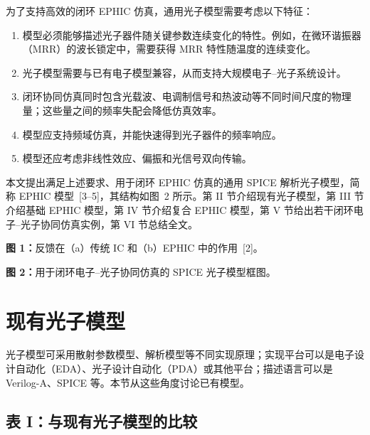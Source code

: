 \documentclass[11pt,a4paper]{ctexart}
\begin{document}
为了支持高效的闭环 EPHIC 仿真，通用光子模型需要考虑以下特征：

\begin{enumerate}[label=\arabic*.]
  \item 模型必须能够描述光子器件随关键参数连续变化的特性。例如，在微环谐振器（MRR）的波长锁定中，需要获得 MRR 特性随温度的连续变化。
  \item 光子模型需要与已有电子模型兼容，从而支持大规模电子--光子系统设计。
  \item 闭环协同仿真同时包含光载波、电调制信号和热波动等不同时间尺度的物理量；这些量之间的频率失配会降低仿真效率。
  \item 模型应支持频域仿真，并能快速得到光子器件的频率响应。
  \item 模型还应考虑非线性效应、偏振和光信号双向传输。
\end{enumerate}

本文提出满足上述要求、用于闭环 EPHIC 仿真的通用 SPICE 解析光子模型，简称 EPHIC 模型~[3--5]，其结构如图~2 所示。第 II 节介绍现有光子模型，第 III 节介绍基础 EPHIC 模型，第 IV 节介绍复合 EPHIC 模型，第 V 节给出若干闭环电子--光子协同仿真实例，第 VI 节总结全文。

\noindent\textbf{图 1：}反馈在（a）传统 IC 和（b）EPHIC 中的作用~[2]。\par
\noindent\textbf{图 2：}用于闭环电子--光子协同仿真的 SPICE 光子模型框图。

\section{现有光子模型}

光子模型可采用散射参数模型、解析模型等不同实现原理；实现平台可以是电子设计自动化（EDA）、光子设计自动化（PDA）或其他平台；描述语言可以是 Verilog-A、SPICE 等。本节从这些角度讨论已有模型。

\subsection*{表 I：与现有光子模型的比较}
\end{document}
